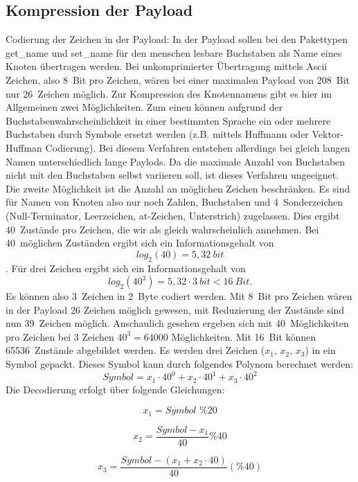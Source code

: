 \documentclass{IEEEtran}
\begin{document}
    \subsection{Kompression der Payload}
    Codierung der Zeichen in der Payload: 
    In der Payload sollen bei den Pakettypen get\_name und set\_name für den menschen lesbare Buchstaben als Name eines Knoten übertragen werden. Bei unkomprimierter Übertragung mittels Ascii Zeichen, also 8~Bit pro Zeichen, wären bei einer maximalen Payload von 208~Bit nur 26~Zeichen möglich. Zur Kompression des Knotennamens gibt es hier im Allgemeinen zwei Möglichkeiten. Zum einen können aufgrund der Buchstabenwahrscheinlichkeit in einer bestimmten Sprache ein oder mehrere Buchstaben durch Symbole ersetzt werden (z.B. mittels Huffmann oder Vektor-Huffman Codierung). Bei diesem Verfahren entstehen allerdings bei gleich langen Namen unterschiedlich lange Paylods. Da die maximale Anzahl von Buchstaben nicht mit den Buchstaben selbst variieren soll, ist dieses Verfahren ungeeignet. Die zweite Möglichkeit ist die Anzahl an möglichen Zeichen beschränken. Es sind für Namen von Knoten also nur noch Zahlen, Buchstaben und 4~Sonderzeichen (Null-Terminator, Leerzeichen, at-Zeichen, Unterstrich) zugelassen. Dies ergibt 40~Zustände pro Zeichen, die wir als gleich wahrscheinlich annehmen. Bei 40~möglichen Zuständen ergibt sich ein Informationsgehalt von $$log_{2}(40) = 5,32~bit$$. Für drei Zeichen ergibt sich ein Informationsgehalt von $$log_{2}(40^3) = 5,32 \cdot 3~bit < 16~Bit.$$ Es können also 3~Zeichen in 2~Byte codiert werden. Mit 8~Bit pro Zeichen wären in der Payload 26 Zeichen möglich gewesen, mit Reduzierung der Zustände sind nun 39~Zeichen möglich.
    Anschaulich gesehen ergeben sich mit 40~Möglichkeiten pro Zeichen bei 3 Zeichen $40^3 = 64000$ Möglichkeiten. Mit 16~Bit können 65536~Zustände abgebildet werden. 
    Es werden drei Zeichen ($x_{1}$, $x_{2}$, $x_{3}$) in ein Symbol gepackt. Dieses Symbol kann durch folgendes Polynom berechnet werden:
    $$Symbol = x_{1} \cdot 40^{0} + x_{2} \cdot 40^{1} + x_{3} \cdot 40^{2}$$
    Die Decodierung erfolgt über folgende Gleichungen:

    $$x_{1}=Symbol \,\, \% 20$$

    $$x_{2} = \frac{Symbol - x_{1}}{40} \% 40$$
    
    $$x_{3} = \frac{Symbol - (x_{1} + x_{2} \cdot 40)}{40} (\% 40)$$
\end{document}

